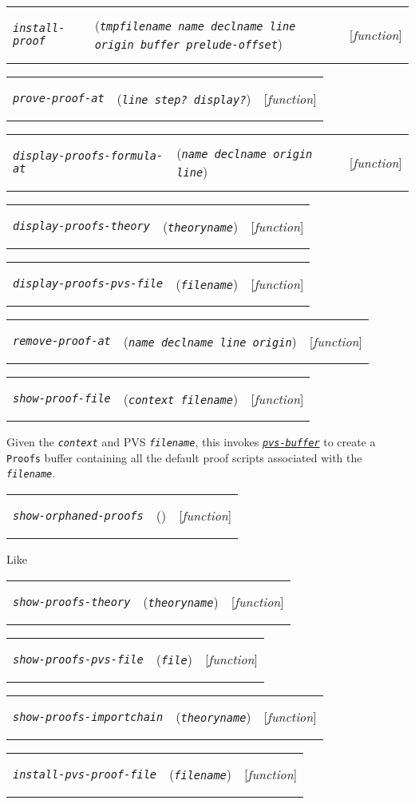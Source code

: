 \documentclass[12pt]{book}
\makeatletter
\newenvironment{function}[3]%
{\par\noindent\begin{boxedminipage}{\textwidth}%
 \par\noindent\begin{tabularx}{\linewidth}{l>{\raggedright}Xr}%
 \functionhtgt{#1}&(\texttt{\textit{#2}})&[\emph{#3}]%
 \end{tabularx}\par\flushright\begin{minipage}{.97\textwidth}}
{\end{minipage}\end{boxedminipage}}
\newcommand{\functionnm}[1]{\texttt{\textit{#1}}}
\newcommand{\functionhln}[1]{\hyperlink{#1}{\functionnm{#1}}}
\newcommand{\functionhtgt}[1]{\hypertarget{#1}{\functionnm{#1}}\index{#1@\functionnm{#1}|underline}}
\newenvironment{lispfunction}[2]%
{\begin{function}{#1}{#2}{function}}{\end{function}}
\makeatother
\begin{document}
\begin{lispfunction}{install-proof}
  {tmpfilename name declname line origin buffer prelude-offset}
\end{lispfunction}

\begin{lispfunction}{prove-proof-at}{line step? display?}
\end{lispfunction}

\begin{lispfunction}{display-proofs-formula-at}{name declname origin line}
\end{lispfunction}

\begin{lispfunction}{display-proofs-theory}{theoryname}
\end{lispfunction}

\begin{lispfunction}{display-proofs-pvs-file}{filename}
\end{lispfunction}

\begin{lispfunction}{remove-proof-at}{name declname line origin}
\end{lispfunction}

\begin{lispfunction}{show-proof-file}{context filename}
Given the \functionnm{context} and PVS \functionnm{filename}, this invokes
\functionhln{pvs-buffer} to create a \texttt{Proofs} buffer containing all
the default proof scripts associated with the \functionnm{filename}.
\end{lispfunction}

\begin{lispfunction}{show-orphaned-proofs}{}
Like 
\end{lispfunction}

\begin{lispfunction}{show-proofs-theory}{theoryname}
\end{lispfunction}

\begin{lispfunction}{show-proofs-pvs-file}{file}
\end{lispfunction}

\begin{lispfunction}{show-proofs-importchain}{theoryname}
\end{lispfunction}

\begin{lispfunction}{install-pvs-proof-file}{filename}
\end{lispfunction}
\end{document}
